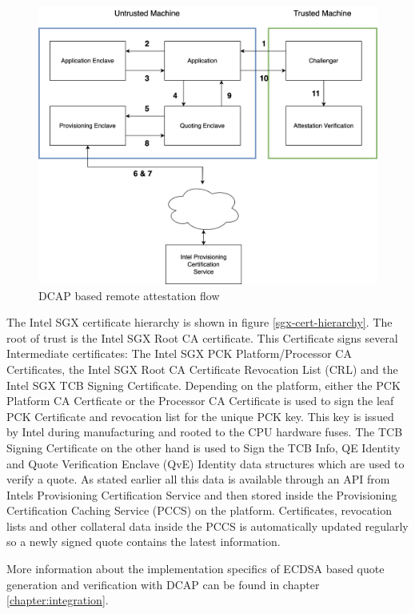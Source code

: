\begin{figure}
	\begin{center} 
		\includegraphics[width=0.7\linewidth]{figures/dcap.drawio.png}
	\end{center}
	\caption{DCAP based remote attestation flow \cite{dcap_quote_generation}} 
	\label{dcap-quote-generation}
\end{figure}

The Intel SGX certificate hierarchy is shown in figure \ref{sgx-cert-hierarchy}. The root of trust is the Intel SGX Root CA certificate. This Certificate signs several Intermediate certificates: The Intel SGX PCK Platform/Processor CA Certificates, the Intel SGX Root CA Certificate Revocation List (CRL) and the Intel SGX TCB Signing Certificate. Depending on the platform, either the PCK Platform CA Certficate or the Processor CA Certificate is used to sign the leaf PCK Certificate and revocation list for the unique PCK key. This key is issued by Intel during manufacturing and rooted to the CPU hardware fuses. The TCB Signing Certificate on the other hand is used to Sign the TCB Info, QE Identity and Quote Verification Enclave (QvE) Identity data structures which are used to verify a quote. As stated earlier all this data is available through an API from Intels Provisioning Certification Service and then stored inside the Provisioning Certification Caching Service (PCCS) on the platform. Certificates, revocation lists and other collateral data inside the PCCS is automatically updated regularly so a newly signed quote contains the latest information. 

More information about the implementation specifics of ECDSA based quote generation and verification with DCAP can be found in chapter \ref{chapter:integration}. 

